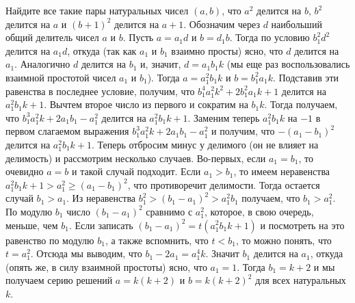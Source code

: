 \problem
Найдите все такие пары натуральных чисел $(a, b)$, что
$a^2$ делится на $b$,
$b^2$ делится на $a$
и $(b + 1)^2$ делится на $a + 1$.
\solution
Обозначим через $d$ наибольший общий делитель чисел $a$ и $b$.
Пусть $a = a_1 d$ и $b = d_1 b$.
Тогда по условию $b_1^2 d^2$ делится на $a_1 d$, откуда
(так как $a_1$ и $b_1$ взаимно просты)
ясно, что $d$ делится на $a_1$.
Аналогично $d$ делится на $b_1$ и, значит, $d = a_1 b_1 k$
(мы еще раз воспользовались взаимной простотой чисел $a_1$ и $b_1$).
Тогда $a = a_1^2 b_1 k$ и $b = b_1^2 a_1 k$.
Подставив эти равенства в последнее условие, получим, что
$b_1^4 a_1^2 k^2 + 2 b_1^2 a_1 k + 1$
делится на $a_1^2 b_1 k + 1$.
Вычтем второе число из первого и сократим на $b_1 k$.
Тогда получаем, что
$b_1^3 a_1^2 k + 2 a_1 b_1 - a_1^2$
делится на $a_1^2 b_1 k + 1$.
Заменим теперь $a_1^2 b_1 k$ на $-1$ в первом слагаемом выражения
$b_1^3 a_1^2 k + 2 a_1 b_1 - a_1^2$ и получим, что $-(a_1 - b_1)^2$ делится на
$a_1^2 b_1 k + 1$.
Теперь отбросим минус у делимого (он не влияет на делимость) и рассмотрим
несколько случаев.
Во-первых, если $a_1 = b_1$, то очевидно $a = b$ и такой случай подходит.
Если $a_1 > b_1$, то имеем неравенства
$a_1^2 b_1 k + 1 > a_1^2 \geq (a_1 - b_1)^2$,
что противоречит делимости.
Тогда остается случай $b_1 > a_1$.
Из неравенства
$b_1^2 > (b_1 - a_1)^2 > a_1^2 b_1$
получаем, что $b_1 > a_1^2$.
По модулю $b_1$ число $(b_1 - a_1)^2$ сравнимо с $a_1^2$,
которое, в свою очередь, меньше, чем $b_1$.
Если записать
$(b_1 - a_1)^2 = t (a_1^2 b_1 k+1)$ и посмотреть на это равенство
по модулю $b_1$, а также вспомнить, что $t < b_1$, то можно понять, что
$t = a_1^2$.
Отсюда мы выводим, что $b_1 - 2 a_1 = a_1^4 k$.
Значит $b_1$ делится на $a_1$, откуда (опять же, в силу взаимной простоты)
ясно, что $a_1 = 1$.
Тогда $b_1 = k + 2$ и мы получаем серию решений
$a = k (k + 2)$ и $b = k (k + 2)^2$ для всех натуральных $k$. 
\endproblem
